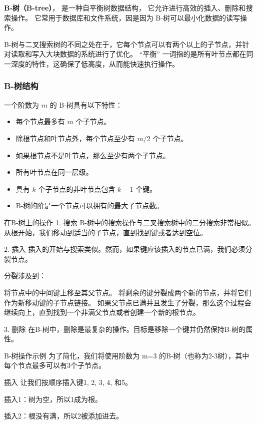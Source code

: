 
\begin{issues}
\issueDraft
\end{issues}


\textbf{B-树（B-tree）}， 是一种自平衡树数据结构， 它允许进行高效的插入、删除和搜索操作。 它常用于数据库和文件系统，因是因为 B-树可以最小化数据的读写操作。

B-树与二叉搜索树的不同之处在于，它每个节点可以有两个以上的子节点，并针对读取和写入大块数据的系统进行了优化。 “平衡” 一词指的是所有叶节点都在同一深度的特性，这确保了低高度，从而能快速执行操作。

\subsubsection{B-树结构}
一个阶数为 $m$ 的 B-树具有以下特性：
\begin{itemize}
\item 每个节点最多有 $m$ 个子节点。
\item 除根节点和叶节点外，每个节点至少有 $m/2$ 个子节点。
\item 如果根节点不是叶节点，那么至少有两个子节点。
\item 所有叶节点在同一层级。
\item 具有 $k$ 个子节点的非叶节点包含 $k-1$ 个键。
\item B-树的阶是一个节点可以拥有的最大子节点数。
\end{itemize}


在B-树上的操作
1. 搜索
B-树中的搜索操作与二叉搜索树中的二分搜索非常相似。从根开始，我们移动到适当的子节点，直到找到键或者达到空位。

2. 插入
插入的开始与搜索类似。然而，如果键应该插入的节点已满，我们必须分裂节点。

分裂涉及到：

将节点中的中间键上移至其父节点。
将剩余的键分裂成两个新的节点，并将它们作为新移动键的子节点链接。
如果父节点已满并且发生了分裂，那么这个过程会继续向上，直到找到一个非满父节点或者创建一个新的根节点。

3. 删除
在B-树中，删除是最复杂的操作。目标是移除一个键并仍然保持B-树的属性。

B-树操作示例
为了简化，我们将使用阶数为 m=3 的B-树（也称为2-3树），其中每个节点最多可以有3个子节点。

插入
让我们按顺序插入键1, 2, 3, 4, 和5。

插入1：树为空，所以1成为根。

插入2：根没有满，所以2被添加进去。

